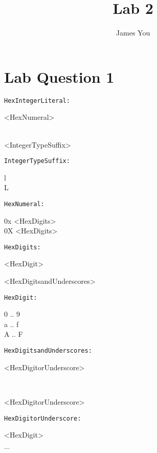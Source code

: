 \documentclass[12pt, letter]{article}
\title{Lab 2}
\author{James You}
\begin{document}
	\maketitle
	\newpage
	\section*{Lab Question 1}
		\texttt{HexIntegerLiteral:}
		\begin{syntdiag}
			<HexNumeral> 
			\begin{stack} \\
				<IntegerTypeSuffix> 
			\end{stack}
		\end{syntdiag}
		\texttt{IntegerTypeSuffix:}
		\begin{syntdiag}
			\begin{stack}
				l \\
				L 
			\end{stack}
		\end{syntdiag}
		\texttt{HexNumeral:}
		\begin{syntdiag}
			\begin{stack}
			0x <HexDigits> \\
			0X <HexDigits>
			\end{stack}
		\end{syntdiag}
		\texttt{HexDigits:}
		\begin{syntdiag}
			\begin{rep} 
				<HexDigit> \\
				\begin{stack}
					<HexDigitsandUnderscores>
				\end{stack}
			\end{rep}
		\end{syntdiag}
		\texttt{HexDigit:}
		\begin{syntdiag}
			\begin{stack}
			0 .. 9 \\
			a .. f \\
			A .. F 
			\end{stack}
		\end{syntdiag}
		\texttt{HexDigitsandUnderscores:}
		\begin{syntdiag}
			<HexDigitorUnderscore>
			\begin{rep} \\
				\begin{stack} 
					<HexDigitorUnderscore>
				\end{stack}
			\end{rep}
		\end{syntdiag}
		\texttt{HexDigitorUnderscore:}
		\begin{syntdiag}
			\begin{stack}
				<HexDigit> \\
				\_
			\end{stack}
		\end{syntdiag}
	\newpage
\end{document}
